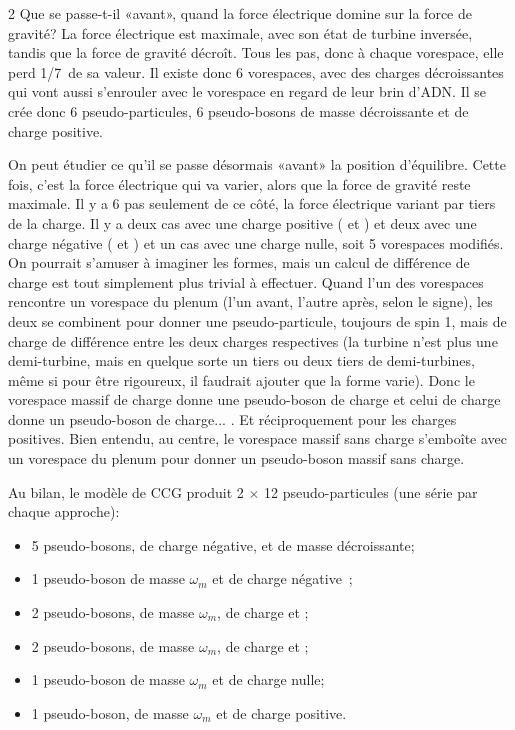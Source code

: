 \begin{multicols}{2}
Que se passe-t-il «avant», quand la force électrique
domine sur la force de gravité? La force électrique est maximale, avec 
son état de turbine inversée, tandis que la force de gravité décroît.
Tous les pas, donc à chaque vorespace, elle perd 1/7\ieme\ de sa valeur. Il
existe donc 6 vorespaces, avec des charges décroissantes qui vont
aussi s'enrouler avec le vorespace en regard de leur brin d'ADN. Il se
crée donc 6 pseudo-particules, 6 pseudo-bosons de masse décroissante
et de charge positive.

On peut étudier ce qu'il se passe désormais «avant» la position
d'équilibre. Cette fois, c'est la force électrique qui va varier,
alors que la force de gravité reste maximale. Il y a 6 pas seulement
de ce côté, la force électrique variant par tiers de la charge. Il y a
deux cas avec une charge positive ( et ) et deux avec une charge
négative ( et ) et un cas avec une charge nulle, soit 5
vorespaces modifiés. On pourrait s'amuser à imaginer les formes, mais
un calcul de différence de charge est tout simplement plus trivial à
effectuer. Quand l'un des vorespaces rencontre un vorespace du plenum
(l'un avant, l'autre après, selon le signe), les deux se combinent pour
donner une pseudo-particule, toujours de spin 1, mais de charge de
différence entre les deux charges respectives (la turbine n'est plus une
demi-turbine, mais en quelque sorte un tiers ou deux tiers de
demi-turbines, même si pour être rigoureux, il faudrait ajouter que la
forme varie). Donc le vorespace massif de charge  donne une
pseudo-boson de charge  et celui de charge  donne un
pseudo-boson de charge... . Et réciproquement pour les charges
positives. Bien entendu, au centre, le vorespace massif sans charge
s'emboîte avec un vorespace du plenum pour donner un pseudo-boson
massif sans charge.
\medskip 

Au bilan, le modèle de CCG produit 2 $\times$ 12 pseudo-particules (une série
par chaque approche):

\begin{itemize}
	\item 5 pseudo-bosons, de charge négative, et de masse décroissante;
	\item 1 pseudo-boson de masse $\omega_m$ et de charge négative ;
	\item 2 pseudo-bosons, de masse $\omega_m$, de charge   et ;
	\item 2 pseudo-bosons, de masse $\omega_m$, de charge  et ;
	\item 1 pseudo-boson de masse $\omega_m$ et de charge nulle;
	\item 1 pseudo-boson, de masse $\omega_m$ et de charge positive.
\end{itemize}


\end{multicols}
